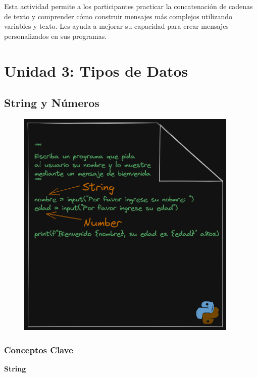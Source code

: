 \documentclass[
  a4paper,
  DIV=11,
  numbers=noendperiod,
  onepage,
  openany]{scrreprt}
\begin{document}
Esta actividad permite a los participantes practicar la concatenación de
cadenas de texto y comprender cómo construir mensajes más complejos
utilizando variables y texto. Les ayuda a mejorar su capacidad para
crear mensajes personalizados en sus programas.

\part{Unidad 3: Tipos de Datos}

\chapter{String y Números}\label{string-y-nuxfameros}

\begin{figure}

{\centering \includegraphics[width=4.16667in,height=\textheight]{unidades/unidad3/images/stringAndNumber.png}

}

\end{figure}

\section{Conceptos Clave}\label{conceptos-clave-7}

\textbf{String}
\end{document}
